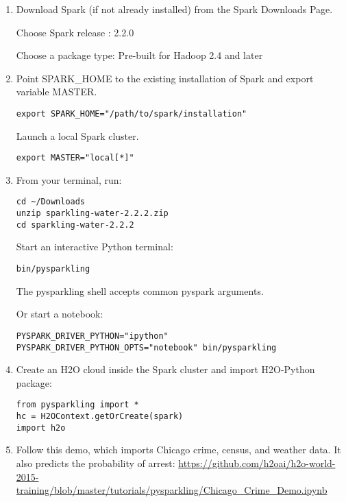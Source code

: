 \begin{enumerate}
\item Download Spark (if not already installed) from the Spark Downloads Page.

Choose Spark release : 2.2.0

Choose a package type: Pre-built for Hadoop 2.4 and later

\item Point SPARK\_HOME to the existing installation of Spark and export variable MASTER.

\begin{lstlisting}[style=Bash]
export SPARK_HOME="/path/to/spark/installation" 
\end{lstlisting}

Launch a local Spark cluster.
\begin{lstlisting}[style=Bash]
export MASTER="local[*]"
\end{lstlisting}

\item From your terminal, run:

\begin{lstlisting}[style=Bash]
cd ~/Downloads
unzip sparkling-water-2.2.2.zip
cd sparkling-water-2.2.2
\end{lstlisting}

Start an interactive Python terminal:
\begin{lstlisting}[style=Bash]
bin/pysparkling
\end{lstlisting}
The pysparkling shell accepts common pyspark arguments.

Or start a notebook:
\begin{lstlisting}[style=Bash]
PYSPARK_DRIVER_PYTHON="ipython" PYSPARK_DRIVER_PYTHON_OPTS="notebook" bin/pysparkling
\end{lstlisting}

\item Create an H2O cloud inside the Spark cluster and import H2O-Python package:

\begin{lstlisting}[style=Python]
from pysparkling import *
hc = H2OContext.getOrCreate(spark)
import h2o
\end{lstlisting}

\item Follow this demo, which imports Chicago crime, census, and weather data. It also predicts the probability of arrest:
 \url{https://github.com/h2oai/h2o-world-2015-training/blob/master/tutorials/pysparkling/Chicago_Crime_Demo.ipynb}

\end{enumerate}

